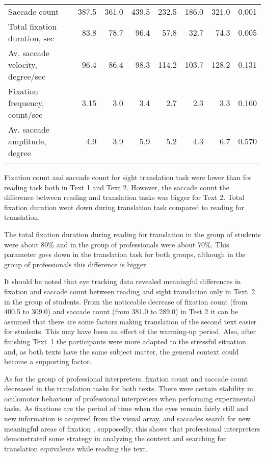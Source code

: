 \documentclass[output=paper]{langscibook}
\begin{document}
\begin{table}[p]
\begin{tabularx}{\textwidth}{Qrrr rrr r}
   Saccade count                     &  387.5 & 361.0 & 439.5  &  232.5 &  186.0   & 321.0 &  0.001\\
   Total fixation  duration, sec     &   83.8 & 78.7  & 96.4   &  57.8  &  32.7    & 74.3  &   0.005\\
   Av. saccade velocity, degree/sec  &   96.4 & 86.4  & 98.3   &  114.2 &  103.7   & 128.2 &    0.131\\
   Fixation frequency, count/sec     & 3.15   & 3.0   & 3.4    &  2.7   & 2.3      & 3.3   &  0.160\\
   Av. saccade amplitude, degree     &  4.9   & 3.9   & 5.9    &   5.2  & 4.3      & 6.7   &  0.570\\
  \lspbottomrule
   \end{tabularx}
 \end{table} 
 
Fixation count and saccade count for sight translation task were lower than for reading task both in Text 1 and Text 2. However, the saccade count the difference between reading and translation tasks was bigger for Text 2. Total fixation duration went down during translation task compared to reading for translation. 

The total fixation duration during reading for translation in the group of students were about 80\% and in the group of professionals were about 70\%. This parameter goes down in the translation task for both groups, although in the group of professionals this difference is bigger.

It should be noted that eye tracking data revealed meaningful differences in fixation and saccade count between reading and sight translation only in Text~2 in the group of students. From the noticeable decrease of fixation count (from 400.5 to 309.0) and saccade count (from 381.0 to 289.0) in Test 2 it can be assumed that there are some factors making translation of the second text easier for students. This may have been an effect of the warming-up period. Also, after finishing Text~1 the participants were more adapted to the stressful situation and, as both texts have the same subject matter, the general context could become a supporting factor.

As for the group of professional interpreters, fixation count and saccade count decreased in the translation tasks for both texts. There were certain stability in oculomotor behaviour of professional interpreters when performing experimental tasks. As fixations are the period of time when the eyes remain fairly still and new information is acquired from the visual array, and saccades search for new meaningful areas of fixation \citep{Rayner2009}, supposedly, this shows that professional interpreters demonstrated some strategy in analyzing the context and searching for translation equivalents while reading the text.
\end{document}
